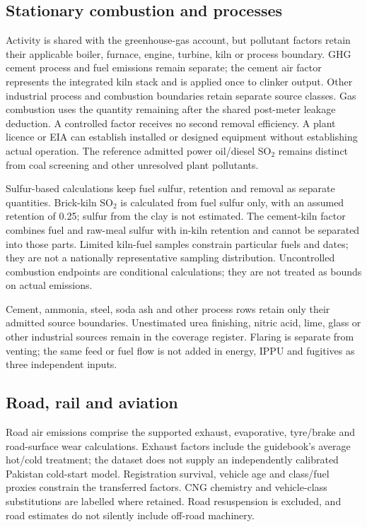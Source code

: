 \documentclass[essd]{copernicus}
\begin{document}
\subsection{Stationary combustion and processes}
Activity is shared with the greenhouse-gas account, but pollutant factors retain their applicable boiler, furnace, engine, turbine, kiln or process boundary. GHG cement process and fuel emissions remain separate; the cement air factor represents the integrated kiln stack and is applied once to clinker output. Other industrial process and combustion boundaries retain separate source classes. Gas combustion uses the quantity remaining after the shared post-meter leakage deduction. A controlled factor receives no second removal efficiency. A plant licence or EIA can establish installed or designed equipment without establishing actual operation. The reference admitted power oil/diesel SO$_2$ remains distinct from coal screening and other unresolved plant pollutants.

Sulfur-based calculations keep fuel sulfur, retention and removal as separate quantities. Brick-kiln SO$_2$ is calculated from fuel sulfur only, with an assumed retention of 0.25; sulfur from the clay is not estimated. The cement-kiln factor combines fuel and raw-meal sulfur with in-kiln retention and cannot be separated into those parts. Limited kiln-fuel samples constrain particular fuels and dates; they are not a nationally representative sampling distribution. Uncontrolled combustion endpoints are conditional calculations; they are not treated as bounds on actual emissions.

Cement, ammonia, steel, soda ash and other process rows retain only their admitted source boundaries. Unestimated urea finishing, nitric acid, lime, glass or other industrial sources remain in the coverage register. Flaring is separate from venting; the same feed or fuel flow is not added in energy, IPPU and fugitives as three independent inputs.

\subsection{Road, rail and aviation}
Road air emissions comprise the supported exhaust, evaporative, tyre/brake and road-surface wear calculations. Exhaust factors include the guidebook's average hot/cold treatment; the dataset does not supply an independently calibrated Pakistan cold-start model. Registration survival, vehicle age and class/fuel proxies constrain the transferred factors. CNG chemistry and vehicle-class substitutions are labelled where retained. Road resuspension is excluded, and road estimates do not silently include off-road machinery.
\end{document}
